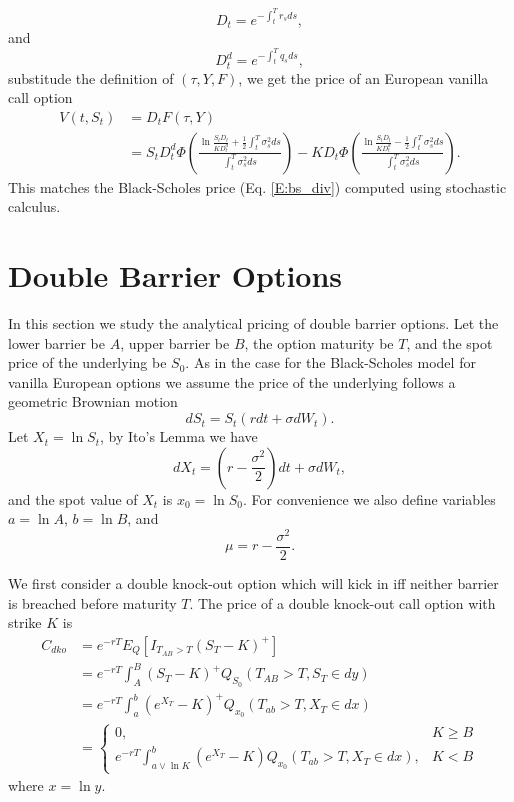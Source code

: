 \[
	D_t = e^{-\int_t^T r_s ds},
\]
and
\[
	D_t^d = e^{-\int_t^T q_s ds},
\]
substitude the definition of $(\tau,Y,F)$, we get the price of an European
vanilla call option
\begin{align*}
	V(t,S_t) 
	  &= D_t F(\tau,Y)  \\
		&= S_t D_t^d 
	       \Phi\left( 
					\frac{\ln \frac{S_t D_t}{K D_t^d}+\frac{1}{2}\int_t^T \sigma_s^2 ds}
					     { \int_t^T \sigma_s^2 ds }
				\right)
	    -K D_t \Phi\left( 
					\frac{\ln \frac{S_t D_t}{K D_t^d}-\frac{1}{2}\int_t^T \sigma_s^2 ds}
					     { \int_t^T \sigma_s^2 ds }
				\right).
\end{align*}
This matches the Black-Scholes price (Eq. \ref{E:bs_div}) computed using
stochastic calculus.


\section{Double Barrier Options}
In this section we study the analytical pricing of double barrier options.
Let the lower barrier be $A$, upper barrier be $B$, the option maturity be
$T$, and the spot price of the underlying be $S_0$. 
As in the case for the Black-Scholes model for vanilla European options
we assume the price of the underlying follows a geometric Brownian motion
\[
	dS_t = S_t(rdt + \sigma dW_t).
\]
Let $X_t=\ln S_t$, by Ito's Lemma we have
\[
	dX_t = (r-\frac{\sigma^2}{2})dt + \sigma dW_t,
\]
and the spot value of $X_t$ is $x_0=\ln S_0$. For convenience we also define
variables $a=\ln A$, $b=\ln B$, and
\[
	\mu = r - \frac{\sigma^2}{2}.
\]

We first consider a double knock-out option which will kick in iff neither
barrier is breached before maturity $T$.
The price of a double knock-out call option with strike $K$ is
\begin{align*}
	C_{dko} 
	&= e^{-rT} E_Q[ I_{T_{AB}>T} (S_T-K)^+ ]   \\
	&= e^{-rT} \int_A^B (S_T-K)^+ Q_{S_0}(T_{AB}>T, S_T\in dy)  \\
	&= e^{-rT} \int_a^b (e^{X_T}-K)^+ Q_{x_0}(T_{ab}>T, X_T\in dx)  \\
	&= \begin{cases}
	     0,     & K\ge B  \\
	     e^{-rT} \int_{a\vee\ln K}^b (e^{X_T}-K) Q_{x_0}(T_{ab}>T, X_T\in dx),
			       & K<B 
	   \end{cases}
\end{align*}
where $x=\ln y$.

